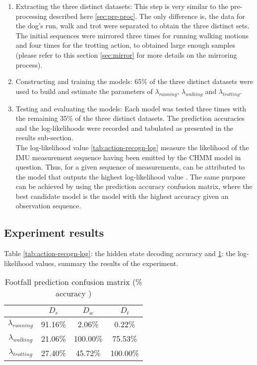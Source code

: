 \begin{enumerate}
	\item Extracting the three distinct datasets: This step is very similar to the pre-processing described here \ref{sec:pre-proc}. The only difference is, the data for the dog's run, walk and trot were separated to obtain the three distinct sets. The initial sequences were mirrored three times for running walking motions and four times for the trotting action, to obtained large enough samples (please refer to this section \ref{sec:mirror} for more details on the mirroring process).
	
	\item Constructing and training the models: 65\% of the three distinct datasets were used to build and estimate the parameters of \(\lambda_{running}\), \(\lambda_{walking}\) and \(\lambda_{trotting}\).
	
	\item Testing and evaluating the models: Each model was tested three times with the remaining 35\% of the three distinct datasets. The prediction accuracies and the log-likelihoods were recorded and tabulated as presented in the results sub-section.\\
	The log-likelihood value \ref{tab:action-recogn-log} measure the likelihood of the IMU measurement sequence having been emitted by the CHMM model in question.
	Thus, for a given sequence of measurements, can be attributed to the model that outputs the highest log-likelihood value \cite{cont2013}.
	The same purpose can be achieved by using the prediction accuracy confusion matrix, where the best candidate model is the model with the highest accuracy given an observation sequence.
\end{enumerate} 

\subsection{Experiment results}

Table \ref{tab:action-recogn-log}: the hidden state decoding accuracy and \ref{tab:action-recogn-acc}: the log-likelihood values, summary the results of the experiment.\\

\begin{table}[h!] 
	\centering
	\begin{tabular}{ c|c|c|c} 	
		\hline
		\hline	
		& \(D_r\) &  \(D_w\) & \(D_t\)\\ 
		\hline
		\hline
		\(\lambda_{running}\) & 91.16\% & 2.06\% & 0.22\% \\ 
		\hline
		\(\lambda_{walking}\) & 21.06\% & 100.00\% & 75.53\% \\ 
		\hline
		\(\lambda_{trotting}\) & 27.40\% & 45.72\% & 100.00\%\\	
		\hline
	\end{tabular}
	\caption{Footfall prediction confusion matrix (\% accuracy )}
	\label{tab:action-recogn-acc}
\end{table}

